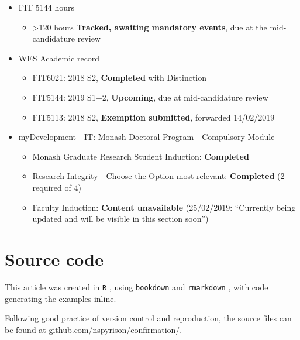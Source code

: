 \documentclass{monashthesis}
\begin{document}
\begin{itemize}
\tightlist
\item
  FIT 5144 hours

  \begin{itemize}
  \tightlist
  \item
    \textgreater{}120 hours \textbf{Tracked, awaiting mandatory events},
    due at the mid-candidature review
  \end{itemize}
\item
  WES Academic record

  \begin{itemize}
  \tightlist
  \item
    FIT6021: 2018 S2, \textbf{Completed} with Distinction
  \item
    FIT5144: 2019 S1+2, \textbf{Upcoming}, due at mid-candidature review
  \item
    FIT5113: 2018 S2, \textbf{Exemption submitted}, forwarded 14/02/2019
  \end{itemize}
\item
  myDevelopment - IT: Monash Doctoral Program - Compulsory Module

  \begin{itemize}
  \tightlist
  \item
    Monash Graduate Research Student Induction: \textbf{Completed}
  \item
    Research Integrity - Choose the Option most relevant:
    \textbf{Completed} (2 required of 4)
  \item
    Faculty Induction: \textbf{Content unavailable} (25/02/2019:
    ``Currently being updated and will be visible in this section
    soon'')
  \end{itemize}
\end{itemize}

\chapter{Source code}\label{sec:source}

This article was created in \texttt{R} \autocite{r_core_team_r:_2018},
using \texttt{bookdown} \autocite{xie_bookdown:_2016} and
\texttt{rmarkdown} \autocite{xie_r_2018}, with code generating the
examples inline.

Following good practice of version control and reproduction, the source
files can be found at
\href{https://github.com/nspyrison/Confirmation}{github.com/nspyrison/confirmation/}.

\appendix
\end{document}
